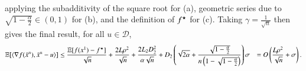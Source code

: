\begin{appendixproof}
\begin{equation}
\begin{aligned}
        \end{aligned}
    \end{equation}
    applying the subadditivity of the square root for (a), geometric series due to $\sqrt{1-\frac{\alpha}{2}}\in (0,1)$ for (b), and the definition of $f^\star$ for (c).
    Taking $\gamma = \frac{1}{\sqrt{n}}$ then gives the final result, for all $u\in\mathcal{D}$,
    \begin{equation*}
        \begin{aligned}
            \mathbb{E}[\langle \nabla f(\bar{x}^n), \bar{x}^n-u\rangle]
                &\leq \frac{\mathbb{E}[f(x^1) - f^\star]}{\sqrt{n}} + \frac{2L\rho^2}{\sqrt{n}} + \frac{2L_2D_2^2}{\alpha\sqrt{n}} + D_2 \left(\sqrt{2\alpha} + \frac{\sqrt{1-\frac{\alpha}{2}}}{n\left(1-\sqrt{1-\frac{\alpha}{2}}\right)}\right)\sigma
                &= O\left(\frac{L\rho^2}{\sqrt{n}}+\sigma\right).
        \end{aligned}
    \end{equation*}
\end{appendixproof}

